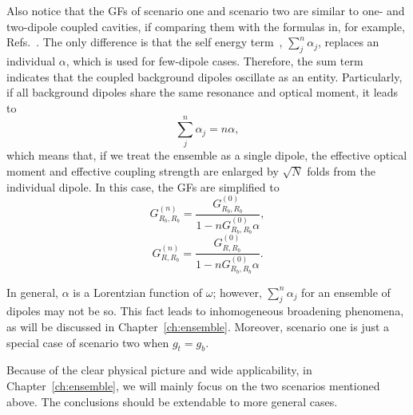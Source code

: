 Also notice that the GFs of scenario one and scenario two are similar to one- and two-dipole coupled cavities, if comparing them with the formulas in, for example, Refs.~. The only difference is that the self energy term~\cite{Mahan2000}, $\sum_j^n{\alpha_j}$, replaces an individual $\alpha$, which is used for few-dipole cases. Therefore, the sum term indicates that the coupled background dipoles oscillate as an entity. Particularly, if all background dipoles share the same resonance and optical moment, it leads to
\begin{equation}
\sum_j^n{\alpha_j}=n\alpha,
\end{equation}
which means that, if we treat the ensemble as a single dipole, the effective optical moment and effective coupling strength are enlarged by $\sqrt{N}$ folds from the individual dipole. In this case, the GFs are simplified to
\begin{equation}
\label{equivGn11}
 G^{(n)}_{R_b,R_b}=\frac{G^{(0)}_{R_b,R_b}}{1-nG^{(0)}_{R_b,R_b}\alpha},
\end{equation}
\begin{equation}
\label{equivGnR1}
 G^{(n)}_{R,R_b}=\frac{G^{(0)}_{R,R_b}}{1-nG^{(0)}_{R_b,R_b}\alpha}.
\end{equation}

In general, $\alpha$ is a Lorentzian function of $\omega$; however, $\sum_j^n{\alpha_j}$ for an ensemble of dipoles may not be so. This fact leads to inhomogeneous broadening phenomena, as will be discussed in Chapter~\ref{ch:ensemble}. Moreover, scenario one is just a special case of scenario two when $g_t=g_b$.

Because of the clear physical picture and wide applicability, in Chapter~\ref{ch:ensemble}, we will mainly focus on the two scenarios mentioned above. The conclusions should be extendable to more general cases.

